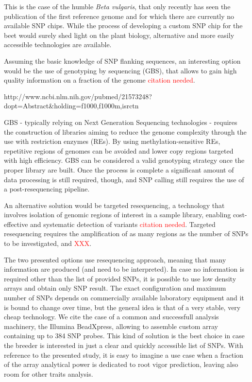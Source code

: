 This is the case of the humble \emph{Beta vulgaris}, that only recently
has seen the publication of the first reference genome \cite{dohm2013genome}
and for which there are currently no available SNP chips. While the process
of developing a custom SNP chip for the beet would surely shed light
on the plant biology, alternative and more easily accessible technologies 
are available.

Assuming the basic knowledge of SNP flanking sequences, an interesting
option would be the use of genotyping by sequencing (GBS), that allows
to gain high quality information on a fraction of the genome
\textcolor{red}{citation needed}. 

http://www.ncbi.nlm.nih.gov/pubmed/21573248?dopt=Abstract&holding=f1000,f1000m,isrctn

GBS - typically relying on Next Generation Sequencing technologies - 
requires the construction of libraries aiming to reduce the genome 
complexity through the use with restriction enzymes (REs). By using 
methylation-sensitive REs, repetitive regions of genomes can be avoided 
and lower copy regions targeted with high efficiency.
GBS can be considered a valid genotyping strategy once the proper library
are built. Once the process is complete a significant amount of data 
processing is still required, though, and SNP calling still requires the use
of a post-resequencing pipeline.

An alternative solution would be targeted resequencing, a technology
that involves isolation of genomic regions of interest in a sample library, 
enabling cost-effective and systematic detection of variants \textcolor{red}{citation needed}. 
Targeted resequencing requires the amplification of as many regions as
the number of SNPs to be investigated, and \textcolor{red}{XXX}. 

The two presented options use resequencing approach, meaning that many 
information are produced (and need to be interpreted). In case no
information is required other than the list of provided SNPs, 
it is possible to use low density arrays and obtain only
SNP result. The exact configuration and maximum number of SNPs depends on
commercially available laboratory equipment and it is bound to change over
time, but the general idea is that of a very stable, very cheap technology.
We cite the case of a common and successfull analysis machinery,
the Illumina BeadXpress, allowing to assemble custom array containing up 
to 384 SNP probes. This kind of solution is the best choice in case
the breeder is interested in just a clear and quickly accessible list of SNPs.
With reference to the presented study, it is easy to imagine a use case when a fraction
of the array analytical power is dedicated to root vigor prediction, leaving
also room for other traits analysis.


